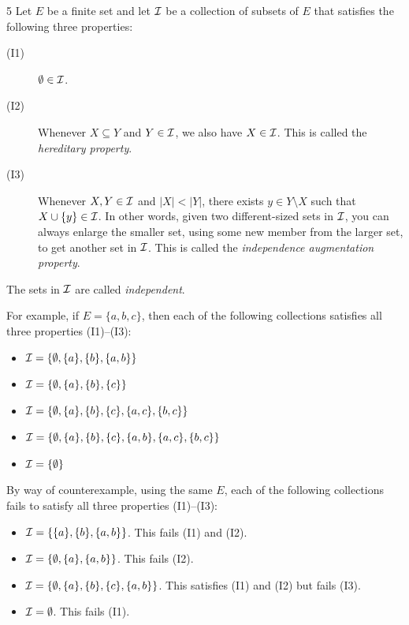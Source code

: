 \documentclass[11pt]{article}
\begin{document}
\begin{exercise}{5}
    Let $E$ be a finite set and let $\mathcal{I}$ be a collection of subsets of
    $E$ that satisfies the following three properties:
    \begin{description}
        \item[(I1)] $\emptyset \in \mathcal{I}$.
        \item[(I2)] Whenever $X \subseteq Y$ and $Y \in \mathcal{I}$, we also
            have $X \in \mathcal{I}$. This is called the \emph{hereditary
            property}.
        \item[(I3)] Whenever $X, Y \in \mathcal{I}$ and $|X| < |Y|$, there
            exists $y \in Y \setminus X$ such that $X \cup \{y\} \in
            \mathcal{I}$. In other words, given two different-sized sets in
            $\mathcal{I}$, you can always enlarge the smaller set, using some
            new member from the larger set, to get another set in
            $\mathcal{I}$. This is called the \emph{independence augmentation
            property}.
    \end{description}
    The sets in $\mathcal{I}$ are called \emph{independent}.

    For example, if $E = \{a,b,c\}$, then each of the following
    collections satisfies all three properties (I1)--(I3):
    \begin{itemize}
        \item $\mathcal{I} = \{\emptyset, \{a\}, \{b\}, \{a,b\}\}$
        \item $\mathcal{I} = \{\emptyset, \{a\}, \{b\}, \{c\}\}$
        \item $\mathcal{I} = \{\emptyset, \{a\}, \{b\}, \{c\}, \{a,c\},\{b,c\}\}$
        \item $\mathcal{I} = \{\emptyset, \{a\}, \{b\}, \{c\}, \{a,b\},\{a,c\},\{b,c\}\}$
        \item $\mathcal{I} = \{\emptyset\}$
    \end{itemize}
    By way of counterexample, using the same $E$, each of the
    following collections fails to satisfy all three properties
    (I1)--(I3):
    \begin{itemize}
        \item $\mathcal{I} = \{\{a\}, \{b\}, \{a,b\}\}$. This fails (I1) and
            (I2).
        \item $\mathcal{I} = \{\emptyset, \{a\}, \{a,b\}\}$. This fails (I2).
        \item $\mathcal{I} = \{\emptyset, \{a\}, \{b\}, \{c\}, \{a,b\}\}$. This
            satisfies (I1) and (I2) but fails (I3).
        \item $\mathcal{I} = \emptyset$. This fails (I1).
    \end{itemize}


\end{exercise}
\end{document}
